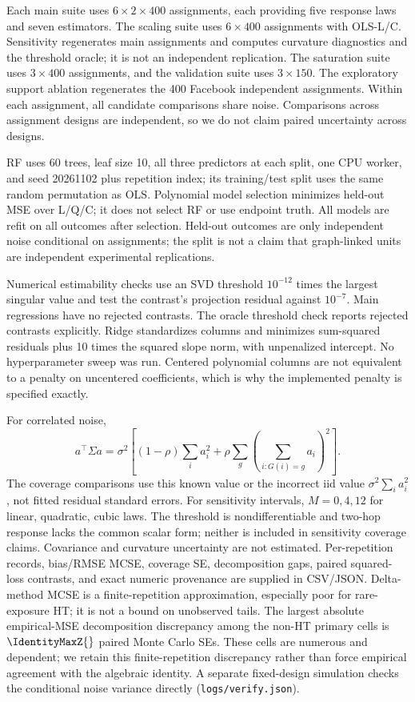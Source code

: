 \documentclass{article}
\begin{document}
Each main suite uses $6\times2\times400$ assignments, each providing five response laws and seven estimators. The scaling suite uses $6\times400$ assignments with OLS-L/C. Sensitivity regenerates main assignments and computes curvature diagnostics and the threshold oracle; it is not an independent replication. The saturation suite uses $3\times400$ assignments, and the validation suite uses $3\times150$. The exploratory support ablation regenerates the 400 Facebook independent assignments. Within each assignment, all candidate comparisons share noise. Comparisons across assignment designs are independent, so we do not claim paired uncertainty across designs.

RF uses 60 trees, leaf size 10, all three predictors at each split, one CPU worker, and seed 20261102 plus repetition index; its training/test split uses the same random permutation as OLS. Polynomial model selection minimizes held-out MSE over L/Q/C; it does not select RF or use endpoint truth. All models are refit on all outcomes after selection. Held-out outcomes are only independent noise conditional on assignments; the split is not a claim that graph-linked units are independent experimental replications.

Numerical estimability checks use an SVD threshold $10^{-12}$ times the largest singular value and test the contrast's projection residual against $10^{-7}$. Main regressions have no rejected contrasts. The oracle threshold check reports rejected contrasts explicitly. Ridge standardizes columns and minimizes sum-squared residuals plus 10 times the squared slope norm, with unpenalized intercept. No hyperparameter sweep was run. Centered polynomial columns are not equivalent to a penalty on uncentered coefficients, which is why the implemented penalty is specified exactly.

For correlated noise,
\[
a^\top\Sigma a=\sigma^2\left[(1-\rho)\sum_i a_i^2+
\rho\sum_g\left(\sum_{i:G(i)=g}a_i\right)^2\right].
\]
The coverage comparisons use this known value or the incorrect iid value $\sigma^2\sum_i a_i^2$, not fitted residual standard errors. For sensitivity intervals, $M=0,4,12$ for linear, quadratic, cubic laws. The threshold is nondifferentiable and two-hop response lacks the common scalar form; neither is included in sensitivity coverage claims. Covariance and curvature uncertainty are not estimated. Per-repetition records, bias/RMSE MCSE, coverage SE, decomposition gaps, paired squared-loss contrasts, and exact numeric provenance are supplied in CSV/JSON. Delta-method MCSE is a finite-repetition approximation, especially poor for rare-exposure HT; it is not a bound on unobserved tails. The largest absolute empirical-MSE decomposition discrepancy among the non-HT primary cells is $\IdentityMaxZ{}$ paired Monte Carlo SEs. These cells are numerous and dependent; we retain this finite-repetition discrepancy rather than force empirical agreement with the algebraic identity. A separate fixed-design simulation checks the conditional noise variance directly (\texttt{logs/verify.json}).
\end{document}
